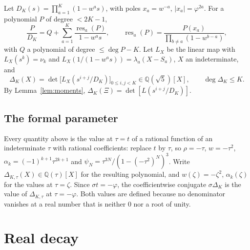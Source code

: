 \documentclass[11pt]{amsart}
\theoremstyle{definition}
\theoremstyle{remark}
\numberwithin{equation}{section}
\newcommand{\QQ}{\mathbb{Q}}
\newcommand{\Res}{\operatorname{res}}
\begin{document}
Let $D_K(s)=\prod_{a=1}^K(1-w^as)$, with poles $x_a=w^{-a}$, $|x_a|=\varphi^{2a}$. For a polynomial $P$ of degree
$<2K-1$,
\[
\frac{P}{D_K}=Q+\sum_{a=1}^K\frac{\Res_a(P)}{1-w^as},\qquad \Res_a(P)=\frac{P(x_a)}{\prod_{b\ne a}(1-w^{b-a})},
\]
with $Q$ a polynomial of degree $\le\deg P-K$. Let $L_X$ be the linear map with $L_X(s^k)=\nu_k$ and
$L_X(1/(1-w^as))=\lambda_a(X-S_a)$, $X$ an indeterminate, and
\[
\Delta_K(X)=\det\bigl[L_X(s^{i+j}/D_K)\bigr]_{0\le i,j<K}\in\QQ(\sqrt5)[X],\qquad\deg\Delta_K\le K.
\]
By Lemma~\ref{lem:moments}, $\Delta_K(\Xi)=\det[L(s^{i+j}/D_K)]$.

\subsection*{The formal parameter}
Every quantity above is the value at $\tau=t$ of a rational function of an indeterminate $\tau$ with rational
coefficients: replace $t$ by $\tau$, so $\rho=-\tau$, $w=-\tau^2$, $\alpha_k=(-1)^{k+1}\tau^{2k+1}$ and
$\psi_N=\tau^{3N}/(1-(-\tau^2)^N)^3$. Write $\Delta_{K,\tau}(X)\in\QQ(\tau)[X]$ for the resulting polynomial, and
$w(\zeta)=-\zeta^2$, $\alpha_k(\zeta)$ for the values at $\tau=\zeta$. Since $\sigma t=-\varphi$, the coefficientwise
conjugate $\sigma\Delta_K$ is the value of $\Delta_{K,\tau}$ at $\tau=-\varphi$. Both values are defined because no
denominator vanishes at a real number that is neither $0$ nor a root of unity.

\section{Real decay}\label{sec:decay}
\end{document}
